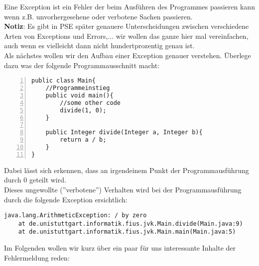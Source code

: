 \begin{Infobox}[Exception]
    Eine Exception ist ein Fehler der beim Ausführen des Programmes passieren kann wenn z.B. unvorhergesehene oder verbotene Sachen passieren.\\


    \textbf{Notiz}: Es gibt in PSE später genauere Unterscheidungen zwischen verschiedene Arten von Exceptions und Errors,... wir wollen das ganze hier mal vereinfachen, auch wenn es vielleicht dann nicht hundertprozentig genau ist.\\

    Als nächstes wollen wir den Aufbau einer Exception genauer verstehen.
    Überlege dazu was der folgende Programmausschnitt macht:

    \begin{lstlisting}[numbers=left,xleftmargin=2em,frame=single,framexleftmargin=1.5em]
public class Main{
    //Programmeinstieg
    public void main(){
        //some other code
        divide(1, 0);
    }
    
    public Integer divide(Integer a, Integer b){
        return a / b;
    }
}
    \end{lstlisting}

    Dabei lässt sich erkennen, dass an irgendeinem Punkt der Programmausführung durch 0 geteilt wird.\\
    Dieses ungewollte (''verbotene'') Verhalten wird bei der Programmausführung durch die folgende Exception ersichtlich:

    \begin{lstlisting}[keywords={}, breaklines=true, numbers=none]
java.lang.ArithmeticException: / by zero
    at de.unistuttgart.informatik.fius.jvk.Main.divide(Main.java:9)
    at de.unistuttgart.informatik.fius.jvk.Main.main(Main.java:5)
    \end{lstlisting}    

    Im Folgenden wollen wir kurz über ein paar für uns interessante Inhalte der Fehlermeldung reden:


\end{Infobox}
